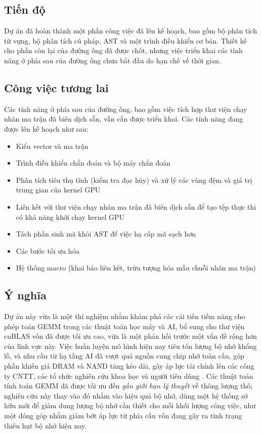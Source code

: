 \documentclass[a4paper]{article}
\begin{document}
	\subsection{Tiến độ}
	Dự án đã hoàn thành một phần công việc đã lên kế hoạch, bao gồm bộ phân tích từ vựng, bộ phân tích cú pháp, AST và một trình điều khiển cơ bản. Thiết kế cho phần còn lại của đường ống đã được chốt, nhưng việc triển khai các tính năng ở phía sau của đường ống chưa bắt đầu do hạn chế về thời gian.

\subsection{Công việc tương lai}
	Các tính năng ở phía sau của đường ống, bao gồm việc tích hợp thư viện chạy nhân ma trận đã biên dịch sẵn, vẫn cần được triển khai. Các tính năng đang được lên kế hoạch như sau:
	\begin{itemize}
		\item Kiểu vector và ma trận
		\item Trình điều khiển chẩn đoán và bộ máy chẩn đoán
		\item Phân tích tiêu thụ tĩnh (kiểm tra đọc hủy) và xử lý các vùng đệm và giá trị trung gian của kernel GPU
		\item Liên kết với thư viện chạy nhân ma trận đã biên dịch sẵn để tạo tệp thực thi có khả năng khởi chạy kernel GPU
		\item Tách phần sinh mã khỏi AST để việc hạ cấp mã sạch hơn
		\item Các bước tối ưu hóa
		\item Hệ thống macro (khai báo liên kết, trừu tượng hóa mẫu chuỗi nhân ma trận)
\end{itemize}

	\subsection{Ý nghĩa}
		Dự án này vừa là một thí nghiệm nhằm khám phá các cải tiến tiềm năng cho phép toán GEMM trong các thuật toán học máy và AI, bổ sung cho thư viện cuBLAS \cite{cublas} vốn đã được tối ưu cao, vừa là một phản hồi trước một vấn đề rộng hơn của lĩnh vực này. Việc huấn luyện mô hình hiện nay tiêu tốn lượng bộ nhớ khổng lồ, và nhu cầu từ hạ tầng AI đã vượt quá nguồn cung chip nhớ toàn cầu, góp phần khiến giá DRAM và NAND tăng kéo dài, gây áp lực tài chính lên các công ty CNTT, các tổ chức nghiên cứu khoa học và người tiêu dùng \cite{DRAM_PRICE}. 
		 Các thuật toán tính toán GEMM đã được tối ưu đến \emph{gần giới hạn lý thuyết} về thông lượng thô; nghiên cứu này thay vào đó nhắm vào hiệu quả bộ nhớ, dùng một hệ thống sở hữu mới để giảm dung lượng bộ nhớ cần thiết cho mỗi khối lượng công việc, như một đóng góp nhằm giảm bớt áp lực từ phía cầu vốn đang gây ra tình trạng thiếu hụt bộ nhớ hiện nay.
\end{document}
